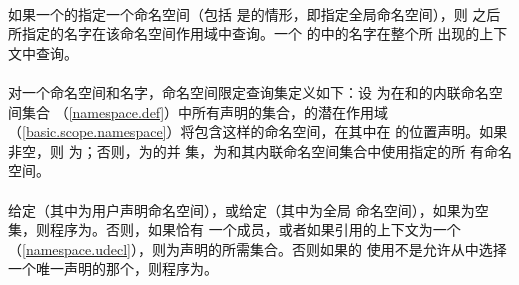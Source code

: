 \paragraph{} %
如果一个的指定一个命名空间（包括
是\tm{::}的情形，即指定全局命名空间），则
之后所指定的名字在该命名空间作用域中查询。一个
的中的名字在整个所
出现的上下文中查询。

\paragraph{} %
对一个命名空间和名字，命名空间限定查询集定义如下：设
为在和的内联命名空间集合
（\ref{namespace.def}）中所有声明的集合，的潜在作用域
（\ref{basic.scope.namespace}）将包含这样的命名空间，在其中在
的位置声明。如果非空，则
为；否则，为的并
集，为和其内联命名空间集合中使用指定的所
有命名空间。

\paragraph{} %
给定（其中为用户声明命名空间），或给定（其中为全局
命名空间），如果为空集，则程序为\illform{}。否则，如果恰有
一个成员，或者如果引用的上下文为一个
（\ref{namespace.udecl}），则为声明的所需集合。否则如果的
使用不是允许从中选择一个唯一声明的那个，则程序为\illform{}。

